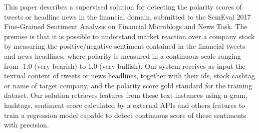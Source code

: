 This paper describes a supervised solution for detecting the polarity scores of tweets or headline news in the financial domain, submitted to the SemEval 2017 Fine-Grained Sentiment Analysis on Financial Microblogs and News Task. The premise is that it is possible to understand market reaction over a company stock by measuring the positive/negative sentiment contained in the financial tweets and news headlines, where polarity is measured in a continuous scale ranging from -1.0 (very bearish) to 1.0 (very bullish). Our system receives as input the textual content of tweets or news headlines, together with their ids, stock cashtag or name of target company, and the polarity score gold standard for the training dataset. Our solution retrieves features from these text instances using n-gram, hashtags, sentiment score calculated by a external APIs and others features to train a regression model capable to detect continuous score of these sentiments with precision.
